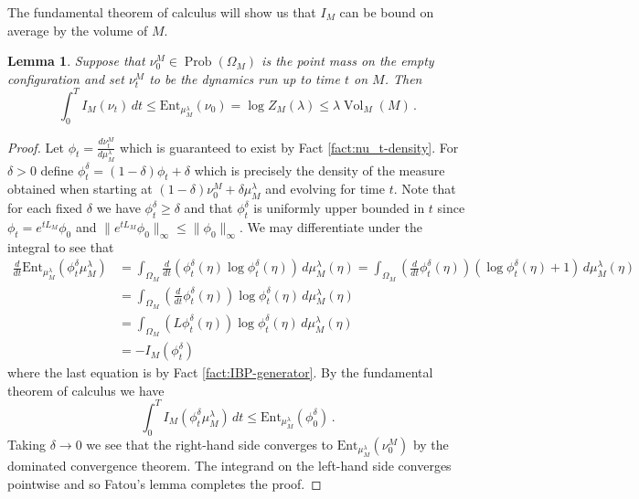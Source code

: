 \documentclass[11pt]{amsart}
\newtheorem{lemma}[theorem]{Lemma}
\theoremstyle{definition}
\theoremstyle{remark}
\newcommand{\Prob}{\operatorname{Prob}}
\newcommand{\Vol}{\operatorname{Vol}}
\begin{document}
The fundamental theorem of calculus will show us that $I_M$ can be bound on average by the volume of $M$.

\begin{lemma}\label{lem:FTC-entropy}
    Suppose that $\nu_0^M \in \Prob(\Omega_M)$ is the point mass on the empty configuration and set $\nu_t^M$ to be the dynamics run up to time $t$ on $M$.  Then $$\int_0^T I_M(\nu_t) \,dt \leq \mathrm{Ent}_{\mu_M^\lambda}(\nu_0) = \log Z_M(\lambda) \leq \lambda \Vol_M(M)\,.$$
\end{lemma}
\begin{proof}
	Let $\phi_t = \frac{d \nu_t^M}{d\mu_M^\lambda}$ which is guaranteed to exist by Fact \ref{fact:nu_t-density}.  For $\delta > 0$ define $\phi_t^\delta = (1 - \delta)\phi_t + \delta$ which is precisely the density of the measure obtained when starting at $(1 - \delta)\nu_0^M + \delta \mu_M^\lambda$ and evolving for time $t$.  Note that for each fixed $\delta$ we have $\phi_t^\delta \geq \delta$ and that $\phi_t^\delta$ is uniformly upper bounded in $t$ since $\phi_t = e^{tL_M} \phi_0$ and $\|e^{tL_M} \phi_0\|_\infty \leq \|\phi_0\|_\infty$.  We may differentiate under the integral to see that
    \begin{align*}
		\frac{d}{dt} \mathrm{Ent}_{\mu_M^\lambda}(\phi_t^\delta \mu_M^\lambda) &= \int_{\Omega_M} \frac{d}{dt}\left(\phi_t^\delta(\eta) \log \phi_t^\delta(\eta) \right) \,d\mu_M^\lambda(\eta) = \int_{\Omega_M} \left(\frac{d}{dt}\phi_t^\delta(\eta)\right) \left(\log \phi_t^\delta(\eta) + 1 \right) \,d\mu_M^\lambda(\eta) \\
		 &= \int_{\Omega_M} \left(\frac{d}{dt}\phi_t^\delta(\eta)\right) \log \phi_t^\delta(\eta) \,d\mu_M^\lambda(\eta) \\
		 &= \int_{\Omega_M} \left(L\phi_t^\delta(\eta)\right) \log \phi_t^\delta(\eta) \,d\mu_M^\lambda(\eta) \\
		 &= - I_M(\phi_t^\delta)
	\end{align*}
	where the last equation is by Fact \ref{fact:IBP-generator}.  By the fundamental theorem of calculus we have \begin{equation*}
		\int_0^T I_M(\phi_t^\delta \mu_M^\lambda)\,dt \leq \mathrm{Ent}_{\mu_M^\lambda}(\phi_0^\delta)\,.
	\end{equation*}
	Taking $\delta \to 0$ we see that the right-hand side converges to 	$\mathrm{Ent}_{\mu_M^\lambda}(\nu_0^M)$ by the dominated convergence theorem.  The integrand on the left-hand side converges pointwise and so Fatou's lemma completes the proof.
\end{proof}
\end{document}
